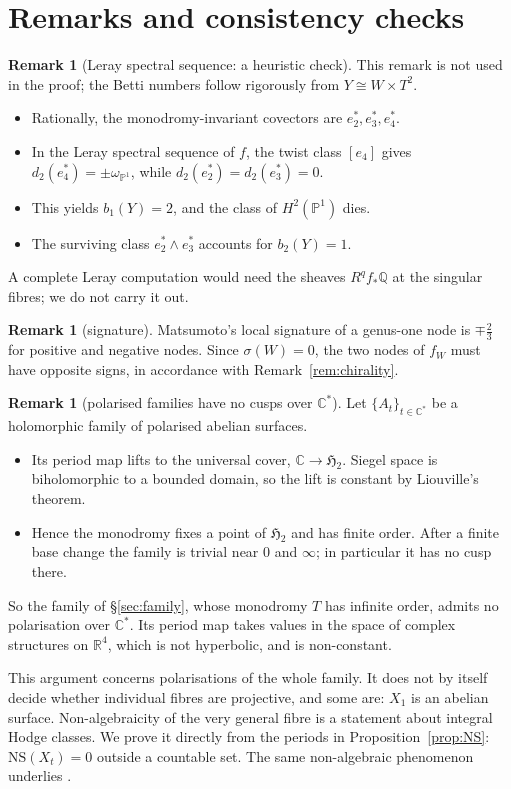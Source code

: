 \documentclass{article}
\theoremstyle{definition}
\newtheorem{remark}[theorem]{Remark}
\theoremstyle{plain}
\newcommand{\R}{\mathbb{R}}
\newcommand{\C}{\mathbb{C}}
\newcommand{\Q}{\mathbb{Q}}
\newcommand{\PP}{\mathbb{P}}
\begin{document}
\section{Remarks and consistency checks}\label{sec:remarks}

\begin{remark}[Leray spectral sequence: a heuristic check]
This remark is not used in the proof; the Betti numbers follow rigorously from
$Y\cong W\times T^2$.
\begin{itemize}
\item Rationally, the monodromy-invariant covectors are $e_2^*,e_3^*,e_4^*$.
\item In the Leray spectral sequence of $f$, the twist class $[e_4]$ gives
  $d_2(e_4^*)=\pm\omega_{\PP^1}$, while $d_2(e_2^*)=d_2(e_3^*)=0$.
\item This yields $b_1(Y)=2$, and the class of $H^2(\PP^1)$ dies.
\item The surviving class $e_2^*\wedge e_3^*$ accounts for $b_2(Y)=1$.
\end{itemize}
A complete Leray computation would need the sheaves $R^qf_*\Q$ at the singular fibres;
we do not carry it out.
\end{remark}

\begin{remark}[signature]
Matsumoto's local signature of a genus-one node is $\mp\tfrac23$ for positive and
negative nodes. Since $\sigma(W)=0$, the two nodes of $f_W$ must have opposite signs,
in accordance with Remark~\ref{rem:chirality}.
\end{remark}

\begin{remark}[polarised families have no cusps over $\C^*$]\label{rem:polarised}
Let $\{A_t\}_{t\in\C^*}$ be a holomorphic family of polarised abelian surfaces.
\begin{itemize}
\item Its period map lifts to the universal cover, $\C\to\mathfrak H_2$. Siegel space
  is biholomorphic to a bounded domain, so the lift is constant by Liouville's theorem.
\item Hence the monodromy fixes a point of $\mathfrak H_2$ and has finite order. After a
  finite base change the family is trivial near $0$ and $\infty$; in particular it has
  no cusp there.
\end{itemize}
So the family of \S\ref{sec:family}, whose monodromy $T$ has infinite order, admits
no polarisation over $\C^*$. Its period map takes values in the space of complex
structures on $\R^4$, which is not hyperbolic, and is non-constant.

This argument concerns polarisations of the whole family. It does not by itself
decide whether individual fibres are projective, and some are: $X_1$ is an abelian
surface. Non-algebraicity of the very general fibre is a statement about integral
Hodge classes. We prove it directly from the periods in Proposition~\ref{prop:NS}:
$\mathrm{NS}(X_t)=0$ outside a countable set. The same non-algebraic phenomenon
underlies \cite{AC26}.
\end{remark}
\end{document}
